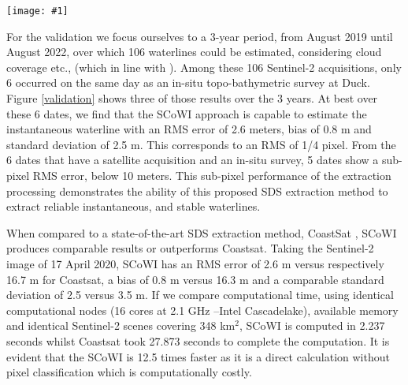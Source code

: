 \documentclass[remotesensing,article,submit,pdftex,moreauthors]{Definitions/mdpi}
\newcommand{\myfigure}[4]{
    \begin{figure*}[ht!]
        \centering
        \texttt{[image: \#1]}	 
        \caption{\itshape#2}
        \label{#3}
    \end{figure*} 
}
\begin{document}
\myfigure{img/Results.png}{Comparison of waterline extracted using the new SCoWI-based extraction method (Shoreliner) proposed in this paper (green line) with the in-situ measured waterline (red line), Duck (USA). The right-hand side histograms display the positional error between the extracted and measured waterline. The smallest the cross-shore RMS error achieved a value of 2.6 meters corresponding to 1/4 of the Sentinel-2 pixel.}{validation}{1}

For the validation we focus ourselves to a 3-year period, from August 2019 until August 2022, over which 106 waterlines could be estimated, considering cloud coverage etc., (which in line with \citep{BERGSMA2020}). Among these 106 Sentinel-2 acquisitions, only 6 occurred on the same day as an in-situ topo-bathymetric survey at Duck. Figure \ref{validation} shows three of those results over the 3 years. At best over these 6 dates, we find that the SCoWI approach is capable to estimate the instantaneous waterline with an RMS error of 2.6 meters, bias of 0.8 m and standard deviation of 2.5 m. This corresponds to an RMS of 1/4 pixel. From the 6 dates that have a satellite acquisition and an in-situ survey, 5 dates show a sub-pixel RMS error, below 10 meters. This sub-pixel performance of the extraction processing demonstrates the ability of this proposed SDS extraction method to extract reliable instantaneous, and stable waterlines.

When compared to a state-of-the-art SDS extraction method, CoastSat \citep{VOS2019_sub}, SCoWI produces comparable results or outperforms Coastsat. Taking the Sentinel-2 image of 17 April 2020, SCoWI has an RMS error of 2.6 m versus respectively 16.7 m for Coastsat, a bias of 0.8 m versus 16.3 m and a comparable standard deviation of 2.5 versus 3.5 m. If we compare computational time, using identical computational nodes (16 cores at 2.1 GHz --Intel Cascadelake), available memory and identical Sentinel-2 scenes covering 348 km$^2$, SCoWI is computed in 2.237 seconds whilst Coastsat took 27.873 seconds to complete the computation. It is evident that the SCoWI is 12.5 times faster as it is a direct calculation without pixel classification which is computationally costly.

\end{document}
